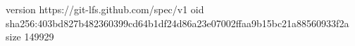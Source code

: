 version https://git-lfs.github.com/spec/v1
oid sha256:403bd827b482360399cd64b1df24d86a23e07002ffaa9b15bc21a88560933f2a
size 149929
